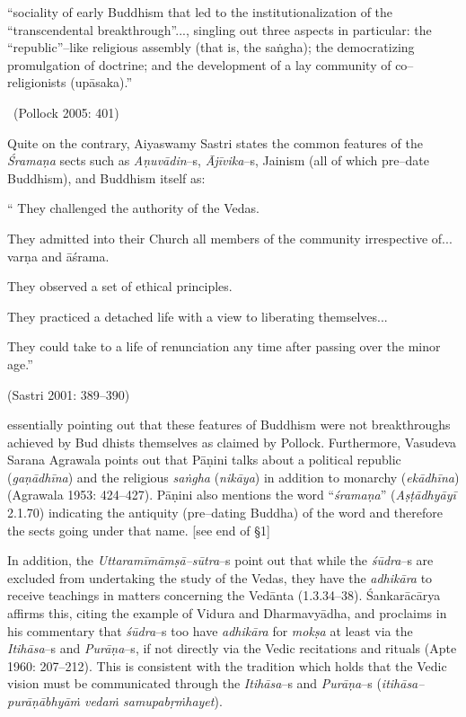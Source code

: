 \begin{myquote}
“sociality of early Buddhism that led to the institutionalization of the “transcendental breakthrough”..., singling out three aspects in particular: the “republic”–like religious assembly (that is, the saṅgha); the democratizing promulgation of doctrine; and the development of a lay community of co–religionists (upāsaka).” 

~\hfill (Pollock 2005: 401)
\end{myquote}

Quite on the contrary, Aiyaswamy Sastri states the common features of the \textit{Śramaṇa} sects such as \textit{Aṇuvādin}–s, \textit{Ājīvika}–s, Jainism (all of which pre–date Buddhism), and Buddhism itself as:

\item “ They challenged the authority of the Vedas.

 \item They admitted into their Church all members of the community irrespective of... varṇa and āśrama.

 \item They observed a set of ethical principles.

 \item They practiced a detached life with a view to liberating themselves...

 \item They could take to a life of renunciation any time after passing over the minor age.”


\begin{flushright}
(Sastri 2001: 389–390)
\end{flushright}

essentially pointing out that these features of Buddhism were not breakthroughs achieved by Bud dhists themselves as claimed by Pollock. Furthermore, Vasudeva Sarana Agrawala points out that Pāṇini talks about a political republic (\textit{gaṇādhīna}) and the religious \textit{saṅgha} (\textit{nikāya}) in addition to monarchy (\textit{ekādhīna}) (Agrawala 1953: 424–427). Pāṇini also mentions the word “\textit{śramaṇa}” (\textit{Aṣṭādhyāyī} 2.1.70) indicating the antiquity (pre–dating Buddha) of the word and therefore the sects going under that name. [see end of §1]

In addition, the \textit{Uttaramīmāmṣā–sūtra}–s point out that while the \textit{śūdra}–s are excluded from undertaking the study of the Vedas, they have the \textit{adhikāra} to receive teachings in matters concerning the Vedānta (1.3.34–38). Śankarācārya affirms this, citing the example of Vidura and Dharmavyādha, and proclaims in his commentary that \textit{śūdra}–s too have \textit{adhikāra} for \textit{mokṣa} at least via the \textit{Itihāsa}–s and \textit{Purāṇa}–s, if not directly via the Vedic recitations and rituals (Apte 1960: 207–212). This is consistent with the tradition which holds that the Vedic vision must be communicated through the \textit{Itihāsa}–s and \textit{Purāṇa}–s (\textit{itihāsa–purāṇābhyāṁ vedaṁ samupabṛṁhayet}).

